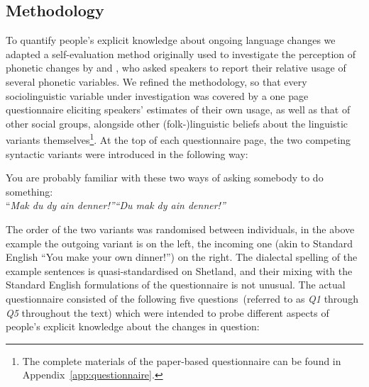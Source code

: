 \subsection{Methodology}\label{sec:questionnaire}

To quantify people's explicit knowledge about ongoing language changes we adapted a self-evaluation method originally used to investigate the perception of phonetic changes by \citet{Labov1966} and \citet{Trudgill1972}, who asked speakers to report their relative usage of several phonetic variables. We refined the methodology, so that every sociolinguistic variable under investigation was covered by a one page questionnaire eliciting speakers' estimates of their own usage, as well as that of other social groups, alongside other (folk-)linguistic beliefs about the linguistic variants themselves\footnote{The complete materials of the paper-based questionnaire can be found in Appendix~\ref{app:questionnaire}.}. At the top of each questionnaire page, the two competing syntactic variants were introduced in the following way:

\begin{framed}
\begin{center}
You are probably familiar with these two ways of asking somebody to do something:\\
``\emph{Mak du dy ain denner!''\hspace{3cm}``Du mak dy ain denner!''}
\end{center}
\end{framed}

The order of the two variants was randomised between individuals, in the above example the outgoing variant is on the left, the incoming one (akin to Standard English ``You make your own dinner!'') on the right. The dialectal spelling of the example sentences is quasi-standardised on Shetland, and their mixing with the Standard English formulations of the questionnaire is not unusual. The actual questionnaire consisted of the following five questions~(referred to as \emph{Q1} through \emph{Q5} throughout the text) which were intended to probe different aspects of people's explicit knowledge about the changes in question:


